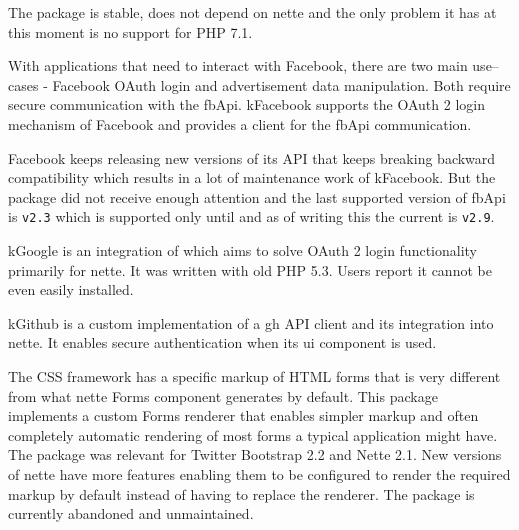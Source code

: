 The package is stable, does not depend on \gls{nette} and the only problem it has at this moment is no support for PHP 7.1.

 \label{sec:state:facebook}

With applications that need to interact with Facebook, there are two main use--cases - Facebook OAuth login and advertisement data manipulation. Both require secure communication with the \gls{fbApi}. \gls{kFacebook} supports the OAuth 2 login mechanism of Facebook and provides a client for the \gls{fbApi} communication.

Facebook keeps releasing new versions of its API that keeps breaking backward compatibility which results in a lot of maintenance work of \gls{kFacebook}. But the package did not receive enough attention and the last supported version of \gls{fbApi} is \lstinline{v2.3} which is supported only until  and as of writing this the current  is \lstinline{v2.9}.

 \label{sec:state:google}

\gls{kGoogle} is an integration of  which aims to solve OAuth 2 login functionality primarily for \gls{nette}. It was written with old PHP 5.3. Users report it cannot be even easily installed.

 \label{sec:state:github}

\gls{kGithub} is a custom implementation of a \gls{gh} API client and its integration into \gls{nette}. It enables secure authentication when its \gls{ui} component is used.

 \label{sec:state:bootstrap-form-renderer}

The CSS framework  has a specific markup of HTML forms that is very different from what \gls{nette} Forms component generates by default. This package implements a custom Forms renderer that enables simpler markup and often completely automatic rendering of most forms a typical application might have. The package was relevant for Twitter Bootstrap 2.2 and Nette 2.1. New versions of \gls{nette} have more features enabling them to be configured to render the required markup by default instead of having to replace the renderer. The package is currently abandoned and unmaintained.

